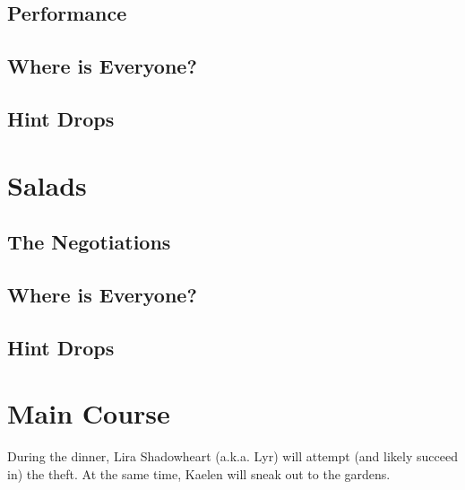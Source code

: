 \documentclass[twocolumn]{dndbook}
\begin{document}
\subsection{Performance}

\subsection{Where is Everyone?}
\subsection{Hint Drops}



\section{Salads}
\subsection{The Negotiations}

\subsection{Where is Everyone?}
\subsection{Hint Drops}



\section{Main Course}

During the dinner, Lira Shadowheart (a.k.a. Lyr) will attempt (and likely succeed in) the theft.
At the same time, Kaelen will sneak out to the gardens.

\end{document}
